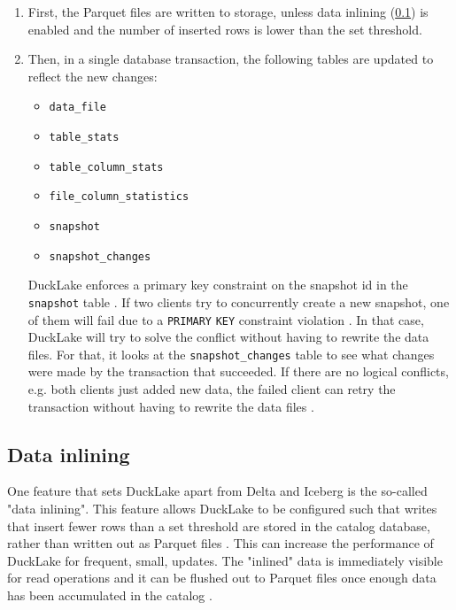 \begin{enumerate}
    \item First, the Parquet files are written to storage, unless data inlining (\ref{sec:ducklake-inlining}) is enabled and the number of inserted rows is lower than the set threshold.

    \item Then, in a single database transaction, the following tables are updated to reflect the new changes: 
    \begin{itemize}
        \item \verb|data_file|
        \item \verb|table_stats|
        \item \verb|table_column_stats|
        \item \verb|file_column_statistics|
        \item \verb|snapshot|
        \item \verb|snapshot_changes|
    \end{itemize}
    DuckLake enforces a primary key constraint on the snapshot id in the \verb|snapshot| table \cite{DuckLakeDocumentationConflict2025}. If two clients try to concurrently create a new snapshot, one of them will fail due to a \verb*|PRIMARY| \verb*|KEY| constraint violation \cite{DuckLakeDocumentationConflict2025}. In that case, DuckLake will try to solve the conflict without having to rewrite the data files. For that, it looks at the \verb|snapshot_changes| table to see what changes were made by the transaction that succeeded. If there are no logical conflicts, e.g. both clients just added new data, the failed client can retry the transaction without having to rewrite the data files \cite{DuckLakeDocumentationConflict2025}.
\end{enumerate}

\subsection{Data inlining}\label{sec:ducklake-inlining}
One feature that sets DuckLake apart from Delta and Iceberg is the so-called "data inlining". This feature allows DuckLake to be configured such that writes that insert fewer rows than a set threshold are stored in the catalog database, rather than written out as Parquet files \cite{DuckLakeDocumentationData2025}. This can increase the performance of DuckLake for frequent, small, updates. The "inlined" data is immediately visible for read operations and it can be flushed out to Parquet files once enough data has been accumulated in the catalog \cite{DuckLakeDocumentationData2025}.

